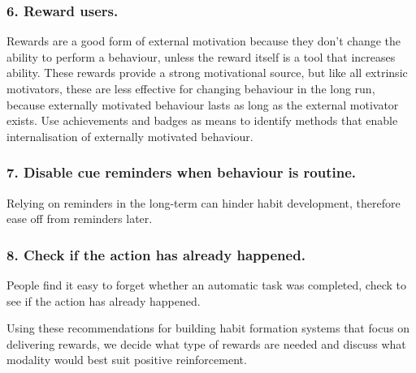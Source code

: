 \subsubsection*{6. Reward users.}
Rewards are a good form of external motivation because they don't change the ability to perform a behaviour, unless the reward itself is a tool that increases ability. These rewards provide a strong motivational source, but like all extrinsic motivators, these are less effective for changing behaviour in the long run, because externally motivated behaviour lasts as long as the external motivator exists. Use achievements and badges as means to identify methods that enable internalisation of externally motivated behaviour.

\subsubsection*{7. Disable cue reminders when behaviour is routine.}
Relying on reminders in the long-term can hinder habit development, therefore ease off from reminders later.

\subsubsection*{8. Check if the action has already happened.}
People find it easy to forget whether an automatic task was completed, check to see if the action has already happened.



Using these recommendations for building habit formation systems that focus on delivering rewards, we decide what type of rewards are needed and discuss what modality would best suit positive reinforcement.
